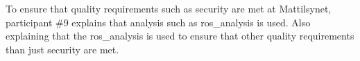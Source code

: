 To ensure that quality requirements such as security are met at Mattilsynet, participant \#9 explains that analysis such as \gls{ros_analysis} is used. Also explaining that the \gls{ros_analysis} is used to ensure that other quality requirements than just security are met.









